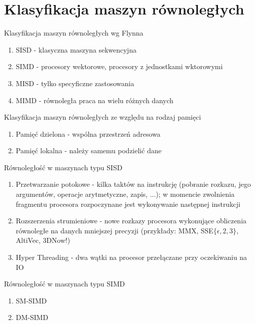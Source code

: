 \documentclass{beamer}
\begin{document}
\section{Klasyfikacja maszyn równoległych}

\begin{frame}{Klasyfikacja maszyn równoległych wg Flynna}
  \begin{enumerate}
  \item SISD - klasyczna maszyna sekwencyjna
  \item SIMD - procesory wektorowe, procesory z jednostkami wktorowymi
  \item MISD - tylko specyficzne zastosowania
  \item MIMD - równoległa praca na wielu różnych danych
  \end{enumerate}
\end{frame}

\begin{frame}{Klasyfikacja maszyn równoległych ze względu na rodzaj pamięci}
  \begin{enumerate}
  \item Pamięć dzielona - wspólna przestrzeń adresowa
  \item Pamięć lokalna - należy samemu podzielić dane
  \end{enumerate}
\end{frame}

\begin{frame}{Równoległość w maszynach typu SISD}
  \begin{enumerate}
  \item Przetwarzanie potokowe - kilka taktów na instrukcję (pobranie rozkazu, jego argumentów, operacje arytmetyczne, zapis, ...); w momencie zwolnienia fragmentu procesora rozpoczynane jest wykonywanie następnej instrukcji
  \item Rozszerzenia strumieniowe - nowe rozkazy procesora wykonujące obliczenia równoległe na danych mniejszej precyzji (przykłady: MMX, SSE$\{\epsilon,2,3\}$, AltiVec, 3DNow!)
  \item Hyper Threading - dwa wątki na procesor przełączane przy oczekiwaniu na IO
  \end{enumerate}
\end{frame}

\begin{frame}{Równoległość w maszynach typu SIMD}
  \begin{enumerate}
  \item SM-SIMD
  \item DM-SIMD
  \end{enumerate}
\end{frame}
\end{document}
